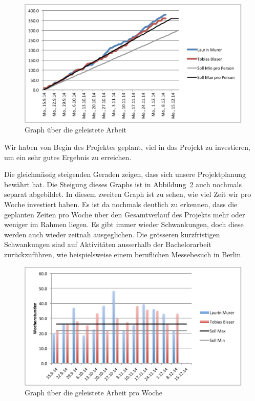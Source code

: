 	\begin{figure}[H]
		\includegraphics[width=\textwidth]{projectPlan/media/img/workGraph.pdf}
		\centering
		\caption{Graph über die geleistete Arbeit}
		\label{fig:workGraph}
	\end{figure}
	
	Wir haben von Begin des Projektes geplant, viel in das Projekt zu investieren, um ein sehr gutes Ergebnis zu erreichen.
	
	Die gleichmässig steigenden Geraden zeigen, dass sich unsere Projektplanung bewährt hat.
	Die Steigung dieses Graphs ist in Abbildung\ \ref{fig:weekhours} auch nochmals separat abgebildet.
	In diesem zweiten Graph ist zu sehen, wie viel Zeit wir pro Woche investiert haben.
	Es ist da nochmals deutlich zu erkennen,
	dass die geplanten Zeiten pro Woche über den Gesamtverlauf des Projekts mehr oder weniger im Rahmen liegen.
	Es gibt immer wieder Schwankungen, doch diese werden auch wieder zeitnah ausgeglichen.
	Die grösseren kurzfristigen Schwankungen sind auf Aktivitäten ausserhalb der Bachelorarbeit zurückzuführen,
	wie beispielsweise einem beruflichen Messebesuch in Berlin.

	\begin{figure}[H]
		\includegraphics[width=\textwidth]{projectPlan/media/img/weekhours.pdf}
		\centering
		\caption{Graph über die geleistete Arbeit pro Woche}
		\label{fig:weekhours}
	\end{figure}

